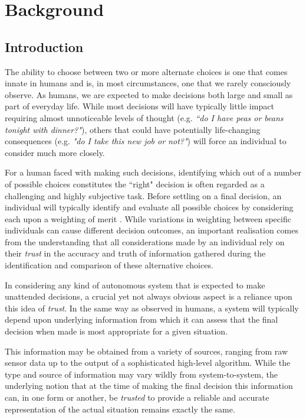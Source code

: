 \section{Background}

\subsection{Introduction}

The ability to choose between two or more alternate choices is one that comes innate in humans and is, in most circumstances, one that we rarely consciously observe. As humans, we are expected to make decisions both large and small as part of everyday life. While most decisions will have typically little impact requiring almost unnoticeable levels of thought (e.g. \textit{``do I have peas or beans tonight with dinner?"}), others that could have potentially life-changing consequences (e.g. \textit{"do I take this new job or not?"}) will force an individual to consider much more closely.

For a human faced with making such decisions, identifying which out of a number of possible choices constitutes the ``right" decision is often regarded as a challenging and highly subjective task. %
Before settling on a final decision, an individual will typically identify and evaluate all possible choices by considering each upon a weighting of merit \cite{rational-decision-model}. While variations in weighting between specific individuals can cause different decision outcomes, an important realisation comes from the understanding that all considerations made by an individual rely on their \textit{trust} in the accuracy and truth of information gathered during the identification and comparison of these alternative choices.

 In considering any kind of autonomous system that is expected to make unattended decisions, a crucial yet not always obvious aspect is a reliance upon this idea of \textit{trust}. In the same way as observed in humans, a system will typically depend upon underlying information from which it can assess that the final decision when made is most appropriate for a given situation.
 
 This information may be obtained from a variety of sources, ranging from raw sensor data up to the output of a sophisticated high-level algorithm. While the type and source of information may vary wildly from system-to-system, the underlying notion that at the time of making the final decision this information can, in one form or another, be \textit{trusted} to provide a reliable and accurate representation of the actual situation remains exactly the same. 
 
